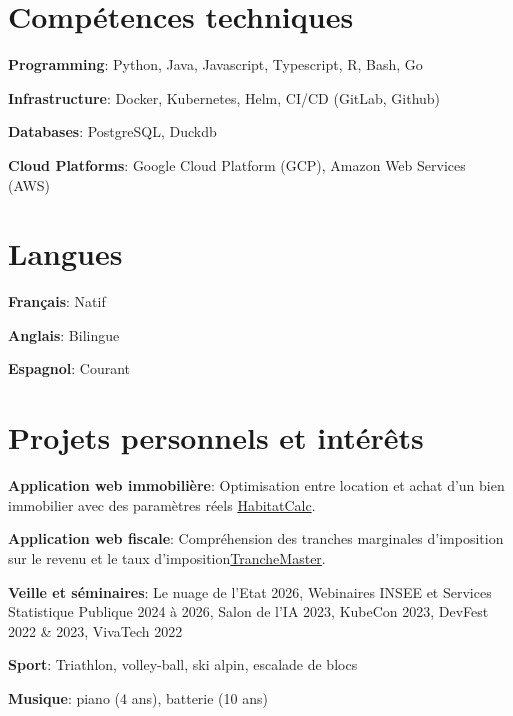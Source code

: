 \documentclass[a4paper,10pt]{article}
\newcommand{\resumeItem}[2]{
  \item\small{
    \textbf{#1}{: #2\vspace{-0.8pt}}
  }
}
\newcommand{\resumeSubItem}[2]{
    \small{\resumeItem{#1}{#2}\vspace{-4pt}}
	}
\newcommand{\resumeSubHeadingListStart}{\begin{itemize}[leftmargin=*]}
\newcommand{\resumeSubHeadingListEnd}{\end{itemize}}
\begin{document}
\begin{minipage}[t]{0.65\linewidth}
    \section{Compétences techniques}
    \resumeSubHeadingListStart
    \resumeSubItem{Programming}{Python, Java, Javascript, Typescript, R, Bash, Go}
    \resumeSubItem{Infrastructure}{Docker, Kubernetes, Helm, CI/CD (GitLab, Github)}
    \resumeSubItem{Databases}{PostgreSQL, Duckdb}
    \resumeSubItem{Cloud Platforms}{Google Cloud Platform (GCP), Amazon Web Services (AWS)}
    \resumeSubHeadingListEnd
    \end{minipage}
\hfill
\begin{minipage}[t]{0.3\linewidth}
    \section{Langues}
    \resumeSubHeadingListStart
    \resumeSubItem{Français}{Natif}
    \resumeSubItem{Anglais}{Bilingue}
    \resumeSubItem{Espagnol}{Courant}
    \resumeSubHeadingListEnd
\end{minipage}



\section{Projets personnels et intérêts}
\vspace{0.5mm}
\begin{minipage}[t]{0.9865\textwidth}
\resumeSubHeadingListStart
  \resumeSubItem{Application web immobilière}{Optimisation entre location et achat d'un bien immobilier avec des paramètres réels \href{https://odysseu.github.io/HabitatCalc/}{HabitatCalc}.}
  \resumeSubItem{Application web fiscale}{Compréhension des tranches marginales d'imposition sur le revenu et le taux d'imposition\href{https://odysseu.github.io/TrancheMaster/}{TrancheMaster}.}
  \resumeSubItem{Veille et séminaires}{Le nuage de l'Etat 2026, Webinaires INSEE et Services Statistique Publique 2024 à 2026, Salon de l'IA 2023, KubeCon 2023, DevFest 2022 \& 2023, VivaTech 2022}
  \resumeSubItem{Sport}{Triathlon, volley-ball, ski alpin, escalade de blocs}
  \resumeSubItem{Musique}{piano (4 ans), batterie (10 ans)}
\resumeSubHeadingListEnd
\end{minipage}


\end{document}
